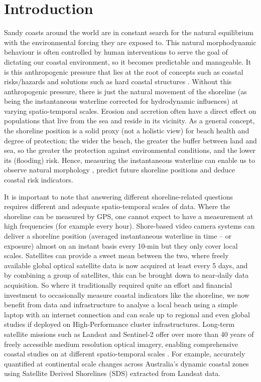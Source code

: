 \documentclass[remotesensing,technicalnote,submit,pdftex,moreauthors]{Definitions/mdpi}
\begin{document}
\section{Introduction}
Sandy coasts around the world are in constant search for the natural equilibrium with the environmental forcing they are exposed to. This natural morphodynamic behaviour is often controlled by human interventions to serve the goal of dictating our coastal environment, so it becomes predictable and manageable. It is this anthropogenic pressure that lies at the root of concepts such as coastal risks/hazards and solutions such as hard coastal structures \citep{Rashidi:2021}. Without this anthropogenic pressure, there is just the natural movement of the shoreline (as being the instantaneous waterline corrected for hydrodynamic influences) at varying spatio-temporal scales. Erosion and accretion often have a direct effect on populations that live from the sea and reside in its vicinity. As a general concept, the shoreline position is a solid proxy (not a holistic view) for beach health and degree of protection; the wider the beach, the greater the buffer between land and sea, so the greater the protection against environmental conditions, and the lower its (flooding) risk. Hence, measuring the instantaneous waterline can enable us to observe natural morphology \citep{Vitousek:17b}, predict future shoreline positions \citep{vitousek:23} and deduce coastal risk indicators.

It is important to note that answering different shoreline-related questions requires different and adequate spatio-temporal scales of data\cite{bergsma2022wave}. Where the shoreline can be measured by GPS, one cannot expect to have a measurement at high frequencies (for example every hour). Shore-based video camera systems can deliver a shoreline position (averaged instantaneous waterline in time -- or exposure) almost on an instant basis every 10-min but they only cover local scales. Satellites can provide a sweet mean between the two, where freely available global optical satellite data is now acquired at least every 5 days, and by combining a group of satellites, this can be brought down to near-daily data acquisition. So where it traditionally required quite an effort and financial investment to occasionally measure coastal indicators like the shoreline, we now benefit from data and infrastructure to analyse a local beach using a simple laptop with an internet connection and can scale up to regional and even global studies if deployed on High-Performance cluster infrastructures. Long-term satellite missions such as Landsat and Sentinel-2 offer over more than 40 years of freely accessible medium resolution optical imagery, enabling comprehensive coastal studies on at different spatio-temporal scales \citep{Apostolopoulos:2021}. For example, \citep{BISHOPTAYLOR:2021} accurately quantified at continental scale changes across Australia's dynamic coastal zones using Satellite Derived Shorelines (SDS) extracted from Landsat data.
\end{document}
